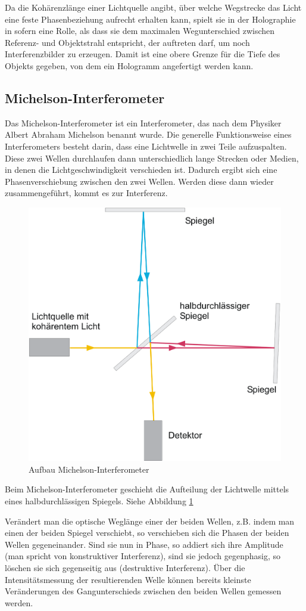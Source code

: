 \documentclass[12pt]{article}
\begin{document}
Da die Kohärenzlänge einer Lichtquelle angibt, über welche Wegstrecke das Licht eine feste
Phasenbeziehung aufrecht erhalten kann, spielt sie in der Holographie in sofern eine Rolle, als
dass sie dem maximalen Wegunterschied zwischen Referenz- und Objektstrahl entspricht, der
auftreten darf, um noch Interferenzbilder zu erzeugen. Damit ist eine obere Grenze für die Tiefe
des Objekts gegeben, von dem ein Hologramm angefertigt werden kann.

\subsection{Michelson-Interferometer}
Das Michelson-Interferometer ist ein Interferometer, das nach dem Physiker Albert Abraham Michelson benannt wurde. 
Die generelle Funktionsweise eines Interferometers besteht darin, dass eine Lichtwelle in zwei Teile aufzuspalten. Diese zwei Wellen durchlaufen dann
unterschiedlich lange Strecken oder Medien, in denen die Lichtgeschwindigkeit verschieden ist. Dadurch ergibt sich eine Phasenverschiebung zwischen den
zwei Wellen. Werden diese dann wieder zusammengeführt, kommt es zur Interferenz.
\begin{figure}[h]
 \centering
 \includegraphics[width=0.5\linewidth]{pictures/michelson.eps}
 \caption{Aufbau Michelson-Interferometer}
 \label{michelson}
\end{figure}
Beim Michelson-Interferometer geschieht die Aufteilung der Lichtwelle mittels eines halbdurchlässigen Spiegels. Siehe Abbildung \ref{michelson}

Verändert man die optische Weglänge einer der beiden Wellen, z.B. indem man einen der beiden Spiegel verschiebt, so verschieben sich die Phasen der beiden
Wellen gegeneinander. Sind sie nun in Phase, so addiert sich ihre Amplitude (man spricht von konstruktiver Interferenz), sind sie jedoch gegenphasig, so
löschen sie sich gegenseitig aus (destruktive Interferenz). Über die Intensitätsmessung der resultierenden Welle können bereits kleinste Veränderungen des
Gangunterschieds zwischen den beiden Wellen gemessen werden.
\end{document}
